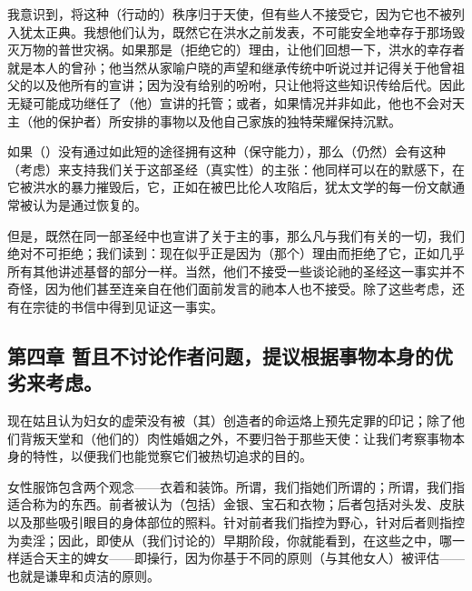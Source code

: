 我意识到，将这种（行动的）秩序归于天使，但有些人不接受它，因为它也不被列入犹太正典。我想他们认为，既然它在洪水之前发表，不可能安全地幸存于那场毁灭万物的普世灾祸。如果那是（拒绝它的）理由，让他们回想一下，洪水的幸存者就是本人的曾孙；他当然从家喻户晓的声望和继承传统中听说过并记得关于他曾祖父的以及他所有的宣讲；因为没有给别的吩咐，只让他将这些知识传给后代。因此无疑可能成功继任了（他）宣讲的托管；或者，如果情况并非如此，他也不会对天主（他的保护者）所安排的事物以及他自己家族的独特荣耀保持沉默。\par

如果（）没有通过如此短的途径拥有这种（保守能力），那么（仍然）会有这种（考虑）来支持我们关于这部圣经（真实性）的主张：他同样可以在的默感下，在它被洪水的暴力摧毁后，它，正如在被巴比伦人攻陷后，犹太文学的每一份文献通常被认为是通过恢复的。\par

但是，既然在同一部圣经中也宣讲了关于主的事，那么凡与我们有关的一切，我们绝对不可拒绝；我们读到：现在似乎正是因为（那个）理由而拒绝了它，正如几乎所有其他讲述基督的部分一样。当然，他们不接受一些谈论祂的圣经这一事实并不奇怪，因为他们甚至连亲自在他们面前发言的祂本人也不接受。除了这些考虑，还有在宗徒的书信中得到见证这一事实。\par


\subsection{第四章 暂且不讨论作者问题，提议根据事物本身的优劣来考虑。}

现在姑且认为妇女的虚荣没有被（其）创造者的命运烙上预先定罪的印记；除了他们背叛天堂和（他们的）肉性婚姻之外，不要归咎于那些天使：让我们考察事物本身的特性，以便我们也能觉察它们被热切追求的目的。\par

女性服饰包含两个观念——衣着和装饰。所谓，我们指她们所谓的；所谓，我们指适合称为的东西。前者被认为（包括）金银、宝石和衣物；后者包括对头发、皮肤以及那些吸引眼目的身体部位的照料。针对前者我们指控为野心，针对后者则指控为卖淫；因此，即使从（我们讨论的）早期阶段，你就能看到，在这些之中，哪一样适合天主的婢女——即操行，因为你基于不同的原则（与其他女人）被评估——也就是谦卑和贞洁的原则。\par

